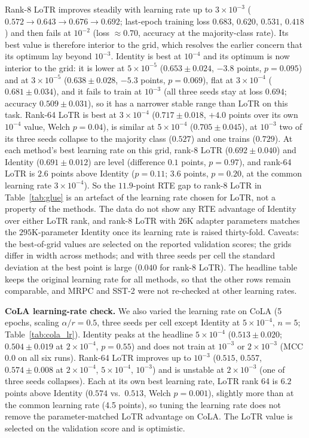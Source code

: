 \documentclass{article}
\theoremstyle{plain}
\begin{document}
\noindent
Rank-8 LoTR improves steadily with learning rate up to $3\times10^{-3}$ ($0.572\to0.643\to0.676\to0.692$; last-epoch training loss
$0.683$, $0.620$, $0.531$, $0.418$) and then fails at $10^{-2}$ (loss $\approx0.70$, accuracy at the majority-class rate).
Its best value is therefore interior to the grid, which resolves the earlier concern that its optimum lay beyond $10^{-3}$.
Identity is best at $10^{-4}$ and its optimum is now interior to the grid: it is lower at $5\times10^{-5}$ ($0.653\pm0.024$, $-3.8$ points, $p=0.095$) and at
$3\times10^{-5}$ ($0.638\pm0.028$, $-5.3$ points, $p=0.069$), flat at $3\times10^{-4}$ ($0.681\pm0.034$), and it fails to train at $10^{-3}$
(all three seeds stay at loss $0.694$; accuracy $0.509\pm0.031$), so it has a narrower stable range than LoTR on this task.
Rank-64 LoTR is best at $3\times10^{-4}$ ($0.717\pm0.018$, $+4.0$ points over its own $10^{-4}$ value, Welch $p=0.04$), is similar at $5\times10^{-4}$ ($0.705\pm0.045$),
at $10^{-3}$ two of its three seeds collapse to the majority class ($0.527$) and one trains ($0.729$).
At each method's best learning rate on this grid, rank-8 LoTR ($0.692\pm0.040$) and Identity ($0.691\pm0.012$) are level (difference $0.1$ points, $p=0.97$),
and rank-64 LoTR is $2.6$ points above Identity ($p=0.11$; $3.6$ points, $p=0.20$, at the common learning rate $3\times10^{-4}$).
So the $11.9$-point RTE gap to rank-8 LoTR in Table~\ref{tab:glue} is an artefact of the learning rate chosen for LoTR, not a property of the methods.
The data do not show any RTE advantage of Identity over either LoTR rank, and rank-8 LoTR with $26$K adapter parameters matches the $295$K-parameter Identity
once its learning rate is raised thirty-fold.
Caveats: the best-of-grid values are selected on the reported validation scores; the grids differ in width across methods; and with three seeds per cell
the standard deviation at the best point is large ($0.040$ for rank-8 LoTR).
The headline table keeps the original learning rate for all methods, so that the other rows remain comparable, and
MRPC and SST-2 were not re-checked at other learning rates.

\textbf{CoLA learning-rate check.}
We also varied the learning rate on CoLA (5 epochs, scaling $\alpha/r=0.5$, three seeds per cell except Identity at $5\times10^{-4}$, $n=5$; Table~\ref{tab:cola_lr}).
Identity peaks at the headline $5\times10^{-4}$ ($0.513\pm0.020$; $0.504\pm0.019$ at $2\times10^{-4}$, $p=0.55$) and does not train at $10^{-3}$ or $2\times10^{-3}$
(MCC $0.0$ on all six runs).
Rank-64 LoTR improves up to $10^{-3}$ ($0.515$, $0.557$, $0.574\pm0.008$ at $2\times10^{-4}$, $5\times10^{-4}$, $10^{-3}$) and is unstable at $2\times10^{-3}$ (one of three seeds collapses).
Each at its own best learning rate, LoTR rank 64 is $6.2$ points above Identity ($0.574$ vs.\ $0.513$, Welch $p=0.001$), slightly more than at the common learning rate (4.5 points),
so tuning the learning rate does not remove the parameter-matched LoTR advantage on CoLA.
The LoTR value is selected on the validation score and is optimistic.
\end{document}
